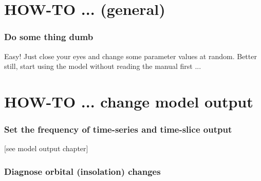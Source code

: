 \documentclass[11pt,fleqn]{book} %
\begin{document}

\newpage


\section{HOW-TO ... (general)}\label{how-to-1}
\vspace{2mm}

%
\subsubsection{Do some thing dumb}\label{Do some thing dumb}

\vspace{1mm}
Easy! Just close your eyes and change some parameter values at random. Better still, start using the model without reading the manual first ...


\newpage


\section{HOW-TO ... change model output}\label{how-to-1}
\vspace{2mm}

%
\subsubsection{Set the frequency of time-series and time-slice output}

\vspace{1mm}
[see model output chapter]

%
\subsubsection{Diagnose orbital (insolation) changes}
\end{document}
